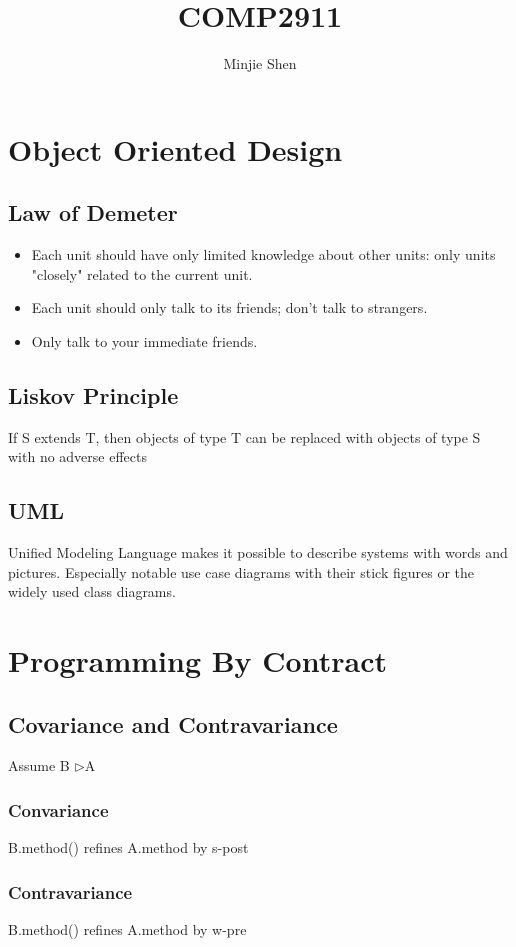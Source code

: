 \documentclass[a4paper]{scrartcl}
\title{COMP2911}
\author{Minjie Shen}
\newcommand{\extends}{\textendash\textendash\textendash$\triangleright$}
\begin{document}
  \maketitle
  \section{Object Oriented Design}
    \subsection {Law of Demeter}
      \begin{itemize}
        \item Each unit should have only limited knowledge about other units: only units "closely" related to the current unit.
        \item Each unit should only talk to its friends; don't talk to strangers.
        \item Only talk to your immediate friends.
      \end{itemize}
      
    \subsection { Liskov Principle }
      If S extends T, then objects of type T can be replaced with objects of type S with no adverse effects
    
    \subsection { UML }
      Unified Modeling Language makes it possible to describe systems with words and pictures. Especially notable use case diagrams with their stick figures or the widely used class diagrams.
  \section{Programming By Contract}
    \subsection { Covariance and Contravariance}
      Assume B \extends A
      \subsubsection{Convariance}
        B.method() refines A.method by s-post
      \subsubsection{Contravariance}
        B.method() refines A.method by w-pre
\end{document}
